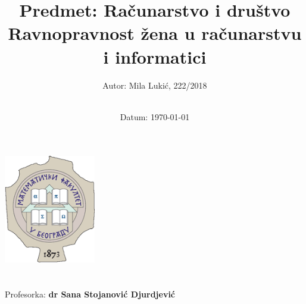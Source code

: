 \title{\Large Predmet: Računarstvo i društvo  \\[0.5cm]
        \bf\Large Ravnopravnost žena u računarstvu i informatici}
\author{\large Autor: Mila Lukić, 222/2018 \\ \ \\}
\date{\large Datum: \today}

\makeatletter
    \begin{titlepage}
        \begin{center}
	   { \includegraphics[width=4cm]{ISI_Logo.png}}
	   {\ \\ \ \\}
        \vbox{}\vspace{2cm}
            {\@title }\\[3cm] 
            {\@author}
            {\large Profesorka: \bf dr Sana Stojanović Djurdjević \\ \ \\}
            {\@date\\}

        \end{center}
    \end{titlepage}
\makeatother
